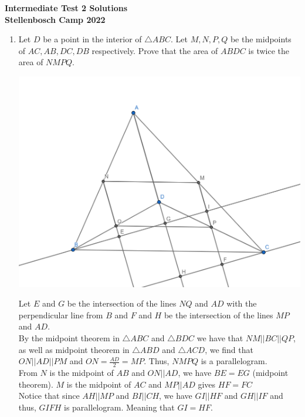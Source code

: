 \documentclass{article}
\begin{document}
\thispagestyle{empty}

\begin{center}
  \textbf{Intermediate Test 2 Solutions}
  \\ \vspace{1em}
  \textbf{\large Stellenbosch Camp 2022}
\end{center}


\begin{enumerate}[itemsep=24pt]

\item %
Let $D$ be a point in the interior of $\triangle ABC$. Let $M,N,P,Q$ be the midpoints of $AC, AB, DC, DB$ respectively. Prove that the area of $ABDC$ is twice the area of $NMPQ$. 

\begin{center}
    \includegraphics[scale=0.6]{IntermediateQ1_Day2Graphic.png}
\end{center}
Let $E$ and $G$ be the intersection of the lines $NQ$ and $AD$ with the perpendicular line from $B$ and $F$ and $H$ be the intersection of the lines $MP$ and $AD$.
\\ By the midpoint theorem in $\triangle ABC$ and $\triangle BDC$ we have that $NM || BC || QP$, as well as midpoint theorem in $\triangle ABD$ and $\triangle ACD$, we find that $ON || AD || PM$ and $ON = \frac{AD}{2} =MP$. Thus, $NMPQ$ is a parallelogram. 
\\From $N$ is the midpoint of $AB$ and $ON||AD$, we have $BE = EG$ (midpoint theorem). $M$ is the midpoint of $AC$ and $MP || AD$ gives $HF = FC$ 
\\Notice that since $AH || MP$ and $BI || CH$, we have $GI || HF$ and $GH || IF$ and thus, $GIFH$ is parallelogram. Meaning that $GI = HF$.

\end{enumerate}
\end{document}
